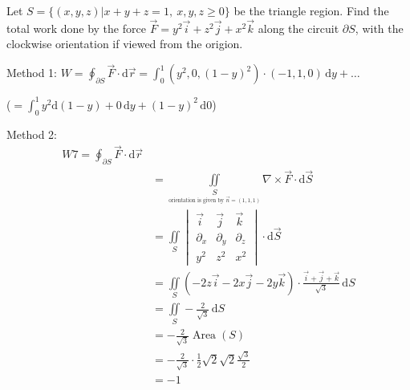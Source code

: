\begin{example}
    Let $S=\{(x,y,z)|x+y+z=1,\ x,y,z\geq 0\}$ be the triangle region. Find the total work done by the force $\overrightarrow{F}=y^2\overrightarrow{i}+z^2\overrightarrow{j}+x^2\overrightarrow{k}$ along the circuit $\partial S$, with the clockwise orientation if viewed from the origion.

    Method 1: $W=\oint_{\partial S}\overrightarrow{F}\cdot\mathrm{d}\overrightarrow{r}=\int_0^1(y^2,0,(1-y)^2)\cdot(-1,1,0)\,\mathrm{d}y+\dots$

    ($=\int_0^1 y^2\mathrm{d}(1-y)+0\,\mathrm{d}y+(1-y)^2\,\mathrm{d}0$)

    Method 2:
    \begin{align*}
        W
        7=\oint_{\partial S}\overrightarrow{F}\cdot\mathrm{d}\overrightarrow{r}                                                                                                        \\
         & =\iint\limits_{\underset{\text{orientation is given by }\overrightarrow{n}=(1,1,1)}{S}}\nabla\times\overrightarrow{F}\cdot\mathrm{d}\overrightarrow{S}                      \\
         & =\iint\limits_S\begin{vmatrix}
                              \overrightarrow{i} & \overrightarrow{j} & \overrightarrow{k} \\
                              \partial_x         & \partial_y         & \partial_z         \\
                              y^2                & z^2                & x^2
                          \end{vmatrix}\cdot\mathrm{d}\overrightarrow{S}                                                                                                 \\
         & =\iint\limits_S(-2z\overrightarrow{i}-2x\overrightarrow{j}-2y\overrightarrow{k})\cdot\frac{\overrightarrow{i}+\overrightarrow{j}+\overrightarrow{k}}{\sqrt{3}}\,\mathrm{d}S \\
         & =\iint\limits_S-\frac{2}{\sqrt{3}}\,\mathrm{d}S                                                                                                                             \\
         & =-\frac{2}{\sqrt{3}}\operatorname{Area}(S)                                                                                                                                  \\
         & =-\frac{2}{\sqrt{3}}\cdot\frac{1}{2}\sqrt{2}\sqrt{2}\frac{\sqrt{3}}{2}                                                                                                      \\
         & =-1
    \end{align*}
\end{example}

